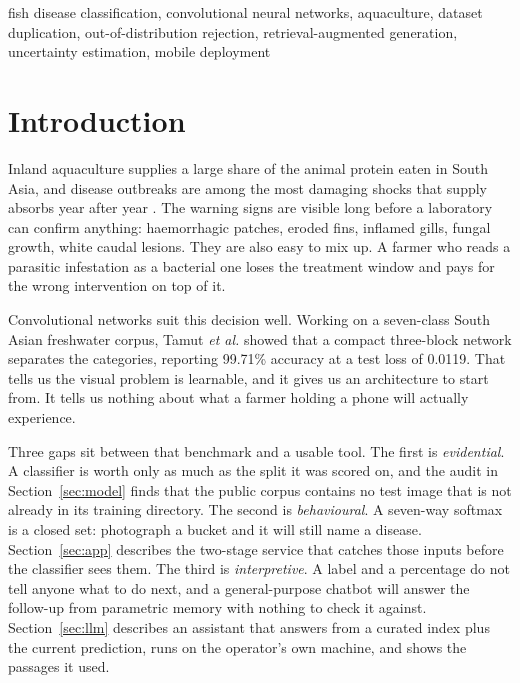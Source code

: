 \documentclass[conference]{IEEEtran}
\begin{document}
\begin{IEEEkeywords}
fish disease classification, convolutional neural networks, aquaculture, dataset duplication, out-of-distribution rejection, retrieval-augmented generation, uncertainty estimation, mobile deployment
\end{IEEEkeywords}

\section{Introduction}

Inland aquaculture supplies a large share of the animal protein eaten in South Asia, and disease outbreaks are among the most damaging shocks that supply absorbs year after year \cite{b33}. The warning signs are visible long before a laboratory can confirm anything: haemorrhagic patches, eroded fins, inflamed gills, fungal growth, white caudal lesions. They are also easy to mix up. A farmer who reads a parasitic infestation as a bacterial one loses the treatment window and pays for the wrong intervention on top of it.

Convolutional networks suit this decision well. Working on a seven-class South Asian freshwater corpus, Tamut \emph{et al.} \cite{b1} showed that a compact three-block network separates the categories, reporting 99.71\% accuracy at a test loss of 0.0119. That tells us the visual problem is learnable, and it gives us an architecture to start from. It tells us nothing about what a farmer holding a phone will actually experience.

Three gaps sit between that benchmark and a usable tool. The first is \emph{evidential}. A classifier is worth only as much as the split it was scored on, and the audit in Section~\ref{sec:model} finds that the public corpus contains no test image that is not already in its training directory. The second is \emph{behavioural}. A seven-way softmax is a closed set: photograph a bucket and it will still name a disease. Section~\ref{sec:app} describes the two-stage service that catches those inputs before the classifier sees them. The third is \emph{interpretive}. A label and a percentage do not tell anyone what to do next, and a general-purpose chatbot will answer the follow-up from parametric memory with nothing to check it against. Section~\ref{sec:llm} describes an assistant that answers from a curated index plus the current prediction, runs on the operator's own machine, and shows the passages it used.
\end{document}
